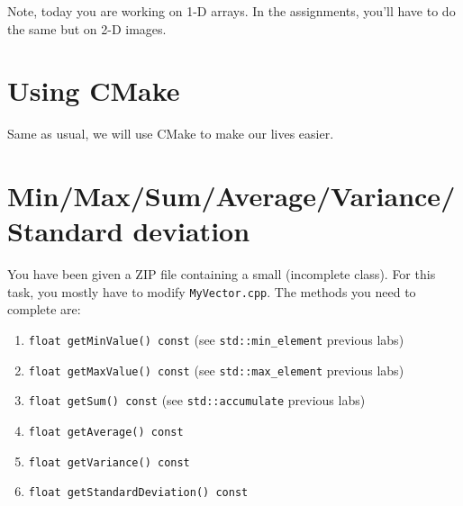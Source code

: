 \documentclass[english,a4paper,12pt,oneside]{article}
\begin{document}
Note, today you are working on 1-D arrays. In the assignments, you'll have to do the same but on 2-D images. 

\section{Using CMake}

Same as usual, we will use CMake to make our lives easier. 

\section{Min/Max/Sum/Average/Variance/Standard deviation}

You have been given a ZIP file containing a small (incomplete class). 
For this task, you mostly have to modify \verb+MyVector.cpp+.
The methods you need to complete are:
\begin{enumerate}
 \item \verb+float getMinValue() const+ (see \verb+std::min_element+ previous labs)
 \item \verb+float getMaxValue() const+ (see \verb+std::max_element+ previous labs)
 \item \verb+float getSum() const+ (see \verb+std::accumulate+ previous labs)
 \item \verb+float getAverage() const+
 \item \verb+float getVariance() const+
 \item \verb+float getStandardDeviation() const+
\end{enumerate}
\end{document}
